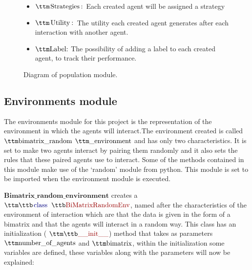 \begin{figure}[H]
\begin{center}
\begin{itemize}
	\item $\pythoninline{Strategies:}$ Each created agent will be assigned a strategy
	\item $\pythoninline{Utility:}$ The utility each created agent generates after each interaction with another agent.
	\item $\pythoninline{Label:}$ The possibility of adding a label to each created agent, to track their performance.
\end{itemize}
\caption{ Diagram of population module.}
\label{fig:diagage}
\end{center}
\end{figure}

\subsection{Environments module}
The environments module for this project is the representation of the environment in which the agents will interact.The environment created is called $\pythoninline{bimatrix\_random}$ $\pythoninline{\_environment}$ and has only two characteristics. It is set to make two agents interact by pairing them randomly and it also sets the rules that these paired agents use to interact. Some of the methods contained in this module make use of the ‘random’ module from python. This module is set to be imported when the environment module is executed. 

$\textbf{Bimatrix\_random\_environment}$ creates a $\pythoninline{class BiMatrixRandomEnv}$, named after the characteristics of the environment of interaction which are that the data is given in the form of a bimatrix and that the agents will interact in a random way. This class has an initialization ( $\pythoninline{\_\_init\_\_}$) method that takes as parameters $\pythoninline{number\_of\_agents}$ and $\pythoninline{bimatrix}$, within the initialization some variables are defined, these variables along with the parameters will now be explained:

